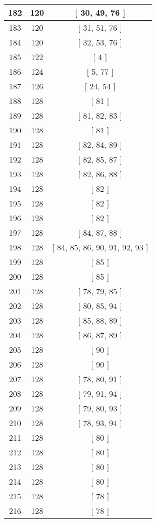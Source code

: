 \begin{center}
\begin{longtable}[H]{|| c c c ||}
\hline
182 & 120 & [ 30, 49, 76 ] \\ 
\hline
183 & 120 & [ 31, 51, 76 ] \\ 
\hline
184 & 120 & [ 32, 53, 76 ] \\ 
\hline
185 & 122 & [ 4 ] \\ 
\hline
186 & 124 & [ 5, 77 ] \\ 
\hline
187 & 126 & [ 24, 54 ] \\ 
\hline
188 & 128 & [ 81 ] \\ 
\hline
189 & 128 & [ 81, 82, 83 ] \\ 
\hline
190 & 128 & [ 81 ] \\ 
\hline
191 & 128 & [ 82, 84, 89 ] \\ 
\hline
192 & 128 & [ 82, 85, 87 ] \\ 
\hline
193 & 128 & [ 82, 86, 88 ] \\ 
\hline
194 & 128 & [ 82 ] \\ 
\hline
195 & 128 & [ 82 ] \\ 
\hline
196 & 128 & [ 82 ] \\ 
\hline
197 & 128 & [ 84, 87, 88 ] \\ 
\hline
198 & 128 & [ 84, 85, 86, 90, 91, 92, 93 ] \\ 
\hline
199 & 128 & [ 85 ] \\ 
\hline
200 & 128 & [ 85 ] \\ 
\hline
201 & 128 & [ 78, 79, 85 ] \\ 
\hline
202 & 128 & [ 80, 85, 94 ] \\ 
\hline
203 & 128 & [ 85, 88, 89 ] \\ 
\hline
204 & 128 & [ 86, 87, 89 ] \\ 
\hline
205 & 128 & [ 90 ] \\ 
\hline
206 & 128 & [ 90 ] \\ 
\hline
207 & 128 & [ 78, 80, 91 ] \\ 
\hline
208 & 128 & [ 79, 91, 94 ] \\ 
\hline
209 & 128 & [ 79, 80, 93 ] \\ 
\hline
210 & 128 & [ 78, 93, 94 ] \\ 
\hline
211 & 128 & [ 80 ] \\ 
\hline
212 & 128 & [ 80 ] \\ 
\hline
213 & 128 & [ 80 ] \\ 
\hline
214 & 128 & [ 80 ] \\ 
\hline
215 & 128 & [ 78 ] \\ 
\hline
216 & 128 & [ 78 ] \\ 

\end{longtable}
\end{center}
